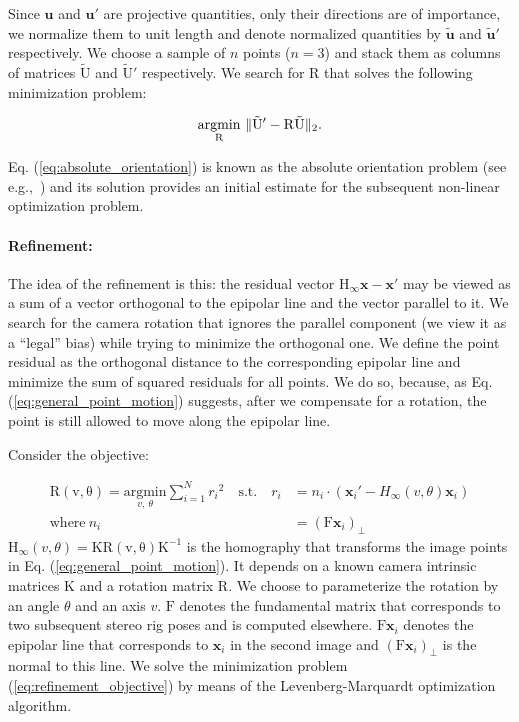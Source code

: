 \documentclass{report}
\DeclarePairedDelimiter{\norm}{\lVert}{\rVert}
\begin{document}
Since $\mathbf{u}$ and $\mathbf{u}'$ are projective quantities, only
their directions are of importance, we normalize them to unit length
and denote normalized quantities by $\mathbf{\tilde{u}}$ and
$\mathbf{\tilde{u}}'$ respectively. We choose a sample of $n$ points
($n=3$) and stack them as columns of matrices $\mathrm{\tilde{U}}$ and
$\mathrm{\tilde{U}'}$ respectively.  We search for $\mathrm{R}$ that
solves the following minimization problem:

\begin{equation}\label{eq:absolute_orientation}
\underset{\mathrm{R}}{\text{argmin}}\ \norm{\mathrm{\tilde{U}'-R\tilde{U}}}_2.
\end{equation}

Eq. (\ref{eq:absolute_orientation}) is known as the absolute
orientation problem (see e.g.,~\cite{Horn1987}) and its solution
provides an initial estimate for the subsequent non-linear
optimization problem.

\paragraph{Refinement:} The idea of the refinement is this: the
residual vector $\mathrm{H}_\infty\mathbf{x} - \mathbf{x}'$ may be
viewed as a sum of a vector orthogonal to the epipolar line and the
vector parallel to it.  We search for the camera rotation that ignores
the parallel component (we view it as a ``legal'' bias) while trying
to minimize the orthogonal one.  We define the point residual as the
orthogonal distance to the corresponding epipolar line and minimize
the sum of squared residuals for all points.  We do so, because, as
Eq. (\ref{eq:general_point_motion}) suggests, after we compensate for
a rotation, the point is still allowed to move along the epipolar
line.

Consider the objective:

\begin{equation}\label{eq:refinement_objective}
  \begin{split}
    \mathrm{R(v,\theta)} = \underset{v,\ \theta}{\mathrm{argmin}}
    \sum_{i=1}^N{r_i}^2\quad \text{s.t.}\quad r_i&=n_i\cdot (\mathbf{x}_i'-H_\infty(v,\theta)\mathbf{x}_i) \\
    \text{where}\ n_i &= (\mathrm{F}\mathbf{x}_i)_\perp
  \end{split}
\end{equation}
$\mathrm{H_\infty}(v,\theta) = \mathrm{KR(v,\theta)K^{-1}}$ is the
homography that transforms the image points in Eq.
(\ref{eq:general_point_motion}). It depends on a known camera
intrinsic matrices $\mathrm{K}$ and a rotation matrix $\mathrm{R}$.
We choose to parameterize the rotation by an angle $\theta$ and an
axis $v$.  $\mathrm{F}$ denotes the fundamental matrix that
corresponds to two subsequent stereo rig poses and is computed
elsewhere. $\mathrm{F}\mathbf{x}_i$ denotes the epipolar line that
corresponds to $\mathbf{x}_i$ in the second image and
$(\mathrm{F}\mathbf{x}_i)_\perp$ is the normal to this line.
We solve the minimization problem
(\ref{eq:refinement_objective}) by means of the Levenberg-Marquardt
optimization algorithm.
\end{document}
